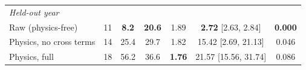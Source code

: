 \begin{table}[htbp]
\begin{tabular}{lcccccc}
\midrule
\multicolumn{7}{l}{\emph{Held-out year}} \\
Raw (physics-free)      & 11 & \textbf{8.2} & \textbf{20.6} & 1.89          & \textbf{2.72} [2.63, 2.84] & \textbf{0.000} \\
Physics, no cross terms & 14 & 25.4         & 29.7          & 1.82          & 15.42 [2.69, 21.13]        & 0.046 \\
Physics, full           & 18 & 56.2         & 36.6          & \textbf{1.76} & 21.57 [15.56, 31.74]       & 0.086 \\
\bottomrule
\end{tabular}
\end{table}

